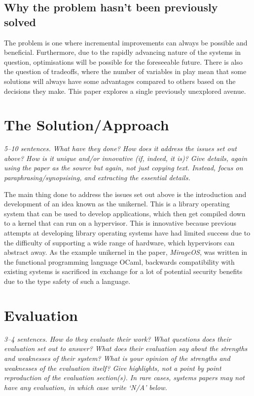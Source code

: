 \documentclass[11pt]{article}
\begin{document}

\subsection*{Why the problem hasn't been previously solved}

The problem is one where incremental improvements can always be possible and
beneficial. Furthermore, due to the rapidly advancing nature of the systems in
question, optimisations will be possible for the foreseeable future. There is
also the question of tradeoffs, where the number of variables in play mean that
some solutions will always have some advantages compared to others based on the
decisions they make. This paper explores a single previously unexplored
avenue.


\section*{The Solution/Approach}

\textsl{5--10 sentences. What have they done? How does it address the issues
set out above? How is it unique and/or innovative (if, indeed, it is)? Give
details, again using the paper as the source but again, not just copying text.
Instead, focus on paraphrasing/synopsising, and extracting the essential
details.} %

The main thing done to address the issues set out above is the introduction and
development of an idea known as the unikernel. This is a library operating
system that can be used to develop applications, which then get compiled down
to a kernel that can run on a hypervisor. This is innovative because previous
attempts at developing library operating systems have had limited success due
to the difficulty of supporting a wide range of hardware, which hypervisors can
abstract away. As the example unikernel in the paper, \textit{MirageOS}, was
written in the functional programming language OCaml, backwards compatibility
with existing systems is sacrificed in exchange for a lot of potential security
benefits due to the type safety of such a language.


\section*{Evaluation}

\textsl{3--4 sentences. How do they evaluate their work? What questions does
their evaluation set out to answer? What does their evaluation say about the
strengths and weaknesses of their system? What is your opinion of the strengths
and weaknesses of the evaluation itself? Give highlights, not a point by point
reproduction of the evaluation section(s). In rare cases, systems papers may
not have any evaluation, in which case write `N/A' below.}
\end{document}
